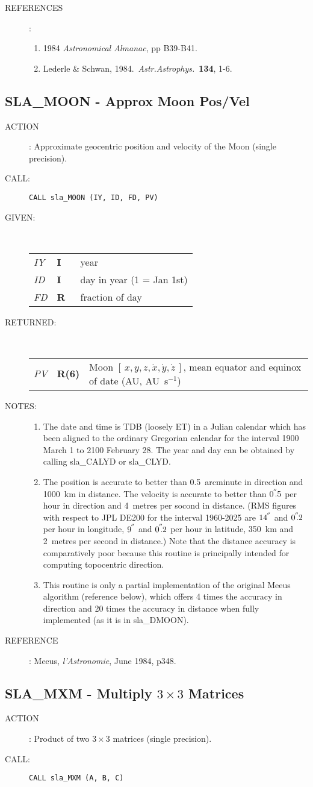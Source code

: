 \documentclass[11pt,twoside]{article}
\newcommand{\xlabel}[1]{}
\newcommand{\xyzxyzd}   {$[\,x,y,z,\dot{x},\dot{y},\dot{z}\,]$}
\newcommand{\arcsec}[2] {\arcseci{#1}$\hspace{-0.4em}.#2$}
\newcommand{\arcsec}[2] {
      {$#1\hspace{-0.05em}^{'\hspace{-0.1em}'}\hspace{-0.4em}.#2$}
   }
\newcommand{\arcseci}[1] {$#1\hspace{-0.05em}$\raisebox{-0.5ex}
                         {$^{'\hspace{-0.1em}'}$}}
\renewcommand{\arcseci}[1] {$#1\hspace{-0.05em}^{'\hspace{-0.1em}'}$}
\newcommand{\routine}[3]
{\hbadness=10000
  \vbox
  {
    \rule{\textwidth}{0.3mm}\\
    {\Large {\bf #1} \hfill #2 \hfill {\bf #1}}\\
    \setlength{\oldspacing}{\topsep}
    \setlength{\topsep}{0.3ex}
    \begin{description}
      #3
    \end{description}
    \setlength{\topsep}{\oldspacing}
  }
}
\renewcommand{\routine}[3]
   {
      \subsection{#1\xlabel{#1} - #2\label{#1}}
       \begin{description}
         #3
       \end{description}
   }
\newcommand{\action}[1]
{\item[ACTION]: #1}
\newcommand{\action}[1]
   {\item[ACTION:] #1}
\newcommand{\call}[1]
{\item[CALL]: \hspace{0.4em}{\tt #1}}
\newlength{\oldspacing}
\renewcommand{\call}[1]
   {
    \item[CALL:] {\tt #1}
   }
\newcommand{\args}[2]
{
  \goodbreak
  \setlength{\oldspacing}{\topsep}
  \setlength{\topsep}{0.3ex}
  \begin{description}
  \item[#1]:\\[1.5ex]
    \begin{tabular}{p{7em}p{6em}p{22em}}
      #2
    \end{tabular}
  \end{description}
  \setlength{\topsep}{\oldspacing}
}
\renewcommand{\args}[2]
   {
     \begin{description}
        \item[#1:]\\
        \begin{tabular}{p{7em}p{6em}l}
           #2
        \end{tabular}
     \end{description}
   }
\newcommand{\spec}[3]
{
  {\em {#1}} & {\bf \mbox{#2}} & {#3}
}
\newcommand{\notes}[1]
{
  \goodbreak
  \setlength{\oldspacing}{\topsep}
  \setlength{\topsep}{0.3ex}
  \begin{description}
    \item[NOTES]:
        #1
  \end{description}
  \setlength{\topsep}{\oldspacing}
}
\renewcommand{\notes}[1]
   {
      \begin{description}
         \item[NOTES:]
            #1
      \end{description}
   }
\newcommand{\aref}[1]
{
  \goodbreak
  \setlength{\oldspacing}{\topsep}
  \setlength{\topsep}{0.3ex}
  \begin{description}
    \item[REFERENCE]:
        #1
  \end{description}
  \setlength{\topsep}{\oldspacing}
}
\newcommand{\aref}[1]
   {
     \begin{description}
       \item[REFERENCE:]
           #1
     \end{description}
   }
\newcommand{\refs}[1]
{
  \goodbreak
  \setlength{\oldspacing}{\topsep}
  \setlength{\topsep}{0.3ex}
  \begin{description}
    \item[REFERENCES]:
        #1
  \end{description}
  \setlength{\topsep}{\oldspacing}
}
\newcommand{\refs}[1]
   {
     \begin{description}
       \item[REFERENCES:]
           #1
     \end{description}
   }
\begin{document}
\refs
{
 \begin{enumerate}
  \item 1984 {\it Astronomical Almanac}, pp B39-B41.
  \item Lederle \& Schwan, 1984.\ {\it Astr.Astrophys.}\ {\bf 134}, 1-6.
 \end{enumerate}
}
\routine{SLA\_MOON}{Approx Moon Pos/Vel}
{
 \action{Approximate geocentric position and velocity of the Moon
         (single precision).}
 \call{CALL sla\_MOON (IY, ID, FD, PV)}
}
\args{GIVEN}
{
 \spec{IY}{I}{year} \\
 \spec{ID}{I}{day in year (1 = Jan 1st)} \\
 \spec{FD}{R }{fraction of day}
}
\args{RETURNED}
{
 \spec{PV}{R(6)}{Moon \xyzxyzd, mean equator and equinox of
                 date (AU, AU~s$^{-1}$)}
}
\notes
{
 \begin{enumerate}
  \item The date and time is TDB (loosely ET) in a Julian calendar
        which has been aligned to the ordinary Gregorian
        calendar for the interval 1900 March 1 to 2100 February 28.
        The year and day can be obtained by calling sla\_CALYD or
        sla\_CLYD.
  \item The position is accurate to better than 0.5~arcminute
        in direction and 1000~km in distance.  The velocity
        is accurate to better than \arcsec{0}{5} per hour in direction
        and 4~metres per socond in distance.  (RMS figures with respect
        to JPL DE200 for the interval 1960-2025 are \arcseci{14} and
        \arcsec{0}{2} per hour in longitude, \arcseci{9} and \arcsec{0}{2}
        per hour in latitude, 350~km and 2~metres per second in distance.)
        Note that the distance accuracy is comparatively poor because this
        routine is principally intended for computing topocentric direction.
  \item This routine is only a partial implementation of the original
        Meeus algorithm (reference below), which offers 4 times the
        accuracy in direction and 20 times the accuracy in distance
        when fully implemented (as it is in sla\_DMOON).
 \end{enumerate}
}
\aref{Meeus, {\it l'Astronomie}, June 1984, p348.}
\routine{SLA\_MXM}{Multiply $3\times3$ Matrices}
{
 \action{Product of two $3\times3$ matrices (single precision).}
 \call{CALL sla\_MXM (A, B, C)}
}
\end{document}
